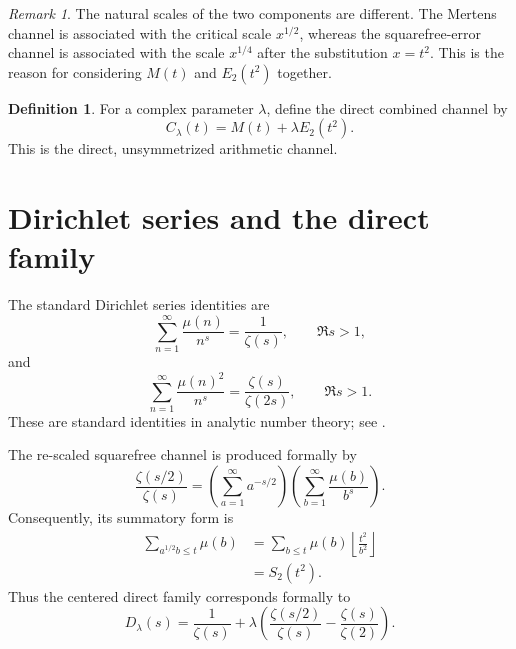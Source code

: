 \documentclass[11pt]{amsart}
\numberwithin{equation}{section}
\theoremstyle{plain}
\theoremstyle{definition}
\newtheorem{definition}[theorem]{Definition}
\theoremstyle{remark}
\newtheorem{remark}[theorem]{Remark}
\begin{document}
\begin{remark}
\label{rem:anisotropic_scaling}
The natural scales of the two components are different.  The Mertens channel is associated with the critical scale \(x^{1/2}\), whereas the squarefree-error channel is associated with the scale \(x^{1/4}\) after the substitution \(x=t^2\).  This is the reason for considering \(M(t)\) and \(E_2(t^2)\) together.
\end{remark}

\begin{definition}
\label{def:direct_lambda_channel}
For a complex parameter \(\lambda\), define the direct combined channel by
\begin{equation}
C_\lambda(t)=M(t)+\lambda E_2(t^2).
\label{eq:C_lambda_definition}
\end{equation}
This is the direct, unsymmetrized arithmetic channel.
\end{definition}

\section{Dirichlet series and the direct family}
\label{sec:dirichlet_series_direct_family}

The standard Dirichlet series identities are
\begin{equation}
\sum_{n=1}^{\infty}\frac{\mu(n)}{n^s}=\frac{1}{\zeta(s)},
\qquad
\Re s>1,
\label{eq:mobius_dirichlet_series}
\end{equation}
and
\begin{equation}
\sum_{n=1}^{\infty}\frac{\mu(n)^2}{n^s}=\frac{\zeta(s)}{\zeta(2s)},
\qquad
\Re s>1.
\label{eq:squarefree_dirichlet_series}
\end{equation}
These are standard identities in analytic number theory; see \cite{Titchmarsh1986,IwaniecKowalski2004}.

The re-scaled squarefree channel is produced formally by
\begin{equation}
\frac{\zeta(s/2)}{\zeta(s)}
=\left(\sum_{a=1}^{\infty}a^{-s/2}\right)
\left(\sum_{b=1}^{\infty}\frac{\mu(b)}{b^s}\right).
\label{eq:rescaled_squarefree_dirichlet_product}
\end{equation}
Consequently, its summatory form is
\begin{align}
\sum_{a^{1/2}b\leq t}\mu(b)
&=\sum_{b\leq t}\mu(b)\left\lfloor \frac{t^2}{b^2}\right\rfloor
\label{eq:rescaled_squarefree_sum_floor}\\
&=S_2(t^2).
\label{eq:rescaled_squarefree_sum_squarefree}
\end{align}
Thus the centered direct family corresponds formally to
\begin{equation}
D_\lambda(s)=\frac{1}{\zeta(s)}
+\lambda\left(\frac{\zeta(s/2)}{\zeta(s)}-\frac{\zeta(s)}{\zeta(2)}\right).
\label{eq:D_lambda_definition}
\end{equation}
\end{document}
